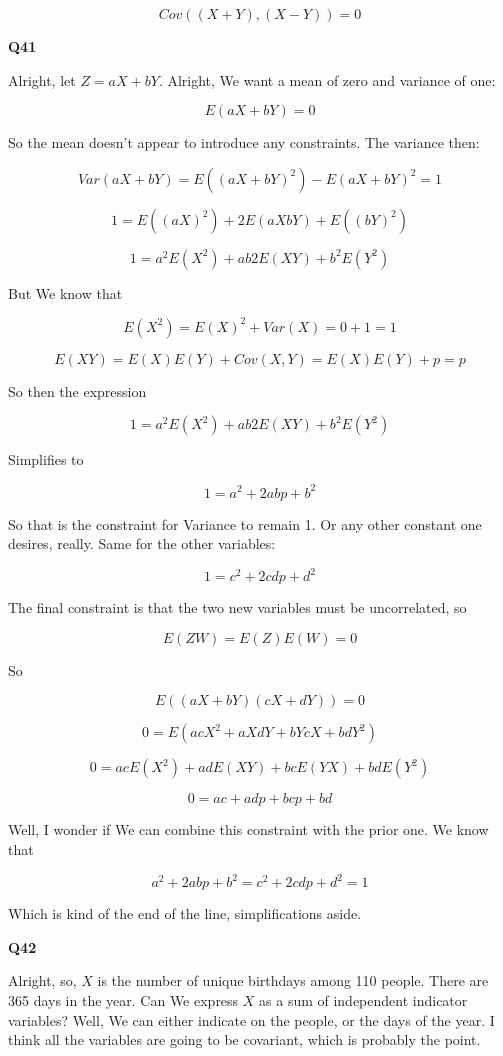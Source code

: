 \documentclass{article}
\begin{document}
			\[ Cov((X+Y), (X-Y)) = 0 \]
			
			\hfill
			
		\textbf{Q41}
		
			Alright, let $Z = aX+bY$. Alright, We want a mean of zero and variance of one:
			
			\[ E(aX + bY) = 0 \]

			So the mean doesn't appear to introduce any constraints. The variance then:
			
			\[ Var(aX + bY) = E((aX+bY)^2) - E(aX+bY)^2 = 1\]
			
			\[ 1 = E((aX)^2) + 2E(aXbY) + E((bY)^2) \]
			
			\[ 1 = a^2E(X^2) + ab2E(XY) + b^2E(Y^2) \]
			
			But We know that
			
			\[ E(X^2) = E(X)^2 + Var(X) = 0 + 1 = 1 \]

			\[ E(XY) = E(X)E(Y) + Cov(X, Y) = E(X)E(Y) + p = p \]

			So then the expression 
			
			\[ 1 = a^2E(X^2) + ab2E(XY) + b^2E(Y^2) \]
			
			Simplifies to
			
			\[ 1 = a^2 + 2abp + b^2 \]
			
			So that is the constraint for Variance to remain 1. Or any other constant one desires, really. Same for the other variables:
			
			\[ 1 = c^2 + 2cdp + d^2 \]
			
			The final constraint is that the two new variables must be uncorrelated, so
			
			\[ E(ZW) = E(Z)E(W) = 0 \]
			
			So 
			
			\[ E((aX+bY)(cX+dY)) = 0 \]
			
			\[ 0 = E(acX^2 + aXdY + bYcX + bdY^2) \]
			
			\[ 0 = acE(X^2) + adE(XY) + bcE(YX) + bdE(Y^2) \]
			
			\[ 0 = ac + adp + bcp + bd \]
			
			Well, I wonder if We can combine this constraint with the prior one. We know that
			
			\[ a^2 + 2abp + b^2 = c^2 + 2cdp + d^2 = 1 \]
			
			Which is kind of the end of the line, simplifications aside.
			
			\hfill
			
		\textbf{Q42}
		
			Alright, so, $X$ is the number of unique birthdays among 110 people. There are 365 days in the year. Can We express $X$ as a sum of independent indicator variables? Well, We can either indicate on the people, or the days of the year. I think all the variables are going to be covariant, which is probably the point. 
			
\end{document}
